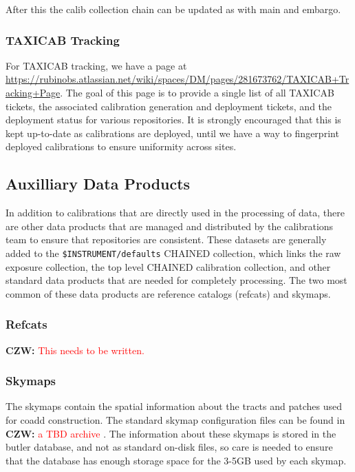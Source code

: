 \documentclass[DM,authoryear,toc]{lsstdoc}
\newcommand{\czw}[1]{
  \textbf{CZW: }\textcolor{red}{#1}
}
\begin{document}
After this the calib collection chain can be updated as with main and embargo.

\subsubsection{TAXICAB Tracking}

For TAXICAB tracking, we have a page at \url{https://rubinobs.atlassian.net/wiki/spaces/DM/pages/281673762/TAXICAB+Tracking+Page}.
The goal of this page is to provide a single list of all TAXICAB tickets, the associated calibration generation and deployment tickets, and the deployment status for various repositories.
It is strongly encouraged that this is kept up-to-date as calibrations are deployed, until we have a way to fingerprint deployed calibrations to ensure uniformity across sites.

\subsection{Auxilliary Data Products}

In addition to calibrations that are directly used in the processing of data, there are other data products that are managed and distributed by the calibrations team to ensure that repositories are consistent.
These datasets are generally added to the \verb|$INSTRUMENT/defaults| CHAINED collection, which links the raw exposure collection, the top level CHAINED calibration collection, and other standard data products that are needed for completely processing.
The two most common of these data products are reference catalogs (refcats) and skymaps.

\subsubsection{Refcats}

\czw{This needs to be written.}

\subsubsection{Skymaps}

The skymaps contain the spatial information about the tracts and patches used for coadd construction.
The standard skymap configuration files can be found in \czw{a TBD archive}.
The information about these skymaps is stored in the butler database, and not as standard on-disk files, so care is needed to ensure that the database has enough storage space for the 3-5GB used by each skymap.
\end{document}
